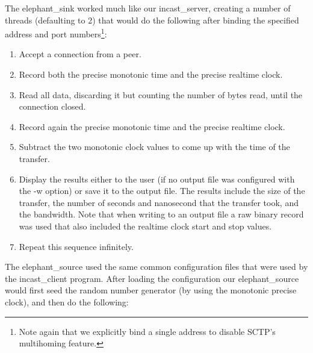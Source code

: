 \documentclass[12pt]{article}
\begin{document}
The elephant\_sink worked much like our incast\_server, creating a number of threads (defaulting to 2) that
would do the following after binding the specified address and port numbers\footnote{Note again that we explicitly bind a
single address to disable SCTP's multihoming feature.}:
\begin{enumerate}

\item Accept a connection from a peer.

\item Record both the precise monotonic time and the precise realtime clock.

\item Read all data, discarding it but counting the number of bytes read, until the connection closed.

\item Record again the precise monotonic time and the precise realtime clock.

\item Subtract the two monotonic clock values to come up with the time of the transfer.


\item Display the results either to the user (if no output file was configured with the -w option) or save
it to the output file. The results include the size of the transfer, the number of seconds and nanosecond
that the transfer took, and the bandwidth. Note that when writing to an output file a raw binary record
was used that also included the realtime clock start and stop values.

\item Repeat this sequence infinitely.

\end{enumerate}

The elephant\_source used the same common configuration files that were used by the incast\_client program.
After loading the configuration our elephant\_source would first
seed the random number generator (by using the monotonic precise clock), and then
do the following:
\end{document}
